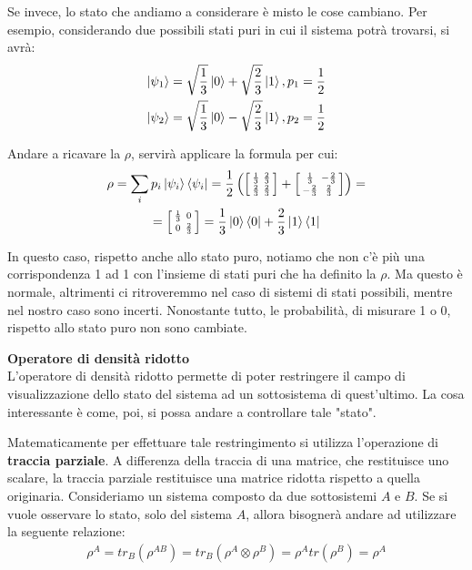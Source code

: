 Se invece, lo stato che andiamo a considerare è misto le cose cambiano. Per esempio, considerando due possibili stati puri in cui il sistema potrà trovarsi, si avrà:
\begin{gather*}
\ket{\psi_1} = \sqrt{\frac{1}{3}}\ket{0} + \sqrt{\frac{2}{3}} \ket{1}, p_1 = \frac{1}{2}\\
\ket{\psi_2} = \sqrt{\frac{1}{3}}\ket{0} - \sqrt{\frac{2}{3}} \ket{1}, p_2 = \frac{1}{2}\\
\end{gather*}

Andare a ricavare la \(\rho\), servirà applicare la formula per cui:
\begin{gather*}
       \rho = \sum_{i}p_i \ket{\psi_i}\bra{\psi_i} = \frac{1}{2}\left(
       \left[\begin{smallmatrix}
       \frac{1}{3} & \frac{2}{3}\\
       \frac{2}{3} & \frac{2}{3}       
       \end{smallmatrix}\right] + 
       \left[\begin{smallmatrix}
       \frac{1}{3} & -\frac{2}{3}\\
       -\frac{2}{3} & \frac{2}{3}       
       \end{smallmatrix}\right]
       \right) =\\
       =\left[\begin{smallmatrix}
       \frac{1}{3} & 0\\
       0 & \frac{2}{3}       
       \end{smallmatrix}\right] = \frac{1}{3}\ket{0}\bra{0}+\frac{2}{3}\ket{1}\bra{1}
\end{gather*}

In questo caso, rispetto anche allo stato puro, notiamo che non c'è più una corrispondenza 1 ad 1 con l'insieme di stati puri che ha definito la \(\rho\). Ma questo è normale, altrimenti ci ritroveremmo nel caso di sistemi di stati possibili, mentre nel nostro caso sono incerti. Nonostante tutto, le probabilità, di misurare 1 o 0, rispetto allo stato puro non sono cambiate. 

\begin{info}
\textbf{Operatore di densità ridotto}\\
L'operatore di densità ridotto permette di poter restringere il campo di visualizzazione dello stato del sistema ad un sottosistema di quest'ultimo. La cosa interessante è come, poi, si possa andare a controllare tale "stato".

Matematicamente per effettuare tale restringimento si utilizza l'operazione di \textbf{traccia parziale}. A differenza della traccia di una matrice, che restituisce uno scalare, la traccia parziale restituisce una matrice ridotta rispetto a quella originaria. Consideriamo un sistema composto da due sottosistemi \(A\) e \(B\). Se si vuole osservare lo stato, solo del sistema \(A\), allora bisognerà andare ad utilizzare la seguente relazione:
\begin{gather*}
\rho^A = tr_B(\rho^{AB}) = tr_B(\rho^A \otimes \rho^B) = \rho^A tr(\rho^B) = \rho^A
\end{gather*}
\end{info}

